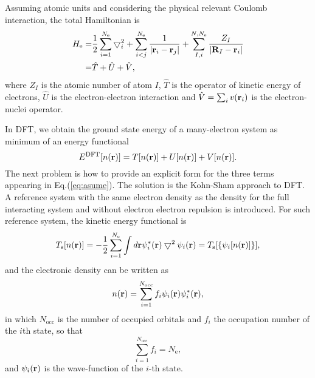 Assuming atomic units and considering the physical relevant Coulomb interaction, the total Hamiltonian is 
\begin{align}        
        H_{\text{e}} =& \frac{1}{2}\sum_{i=1}^{N_{\text{e}}}\bigtriangledown_i^2 +\sum_{i<j}^{N_{\text{e}}}\frac{1}{|{\bf r}_i -{\bf r}_j|} +\sum_{I,i}^{N,N_{\text{e}}}\frac{Z_I}{|{\bf R}_I - {\bf r}_i|}   \nonumber \\
        =& {\hat{T}}+{\hat{U}}+{\hat{V}},
\label{eq:H}
\end{align}
where $Z_I$ is the atomic number of atom $I$, ${\hat{T}}$ is the operator of kinetic energy of electrons, ${\hat{U}}$ is the 
electron-electron interaction and  ${\hat{V}}=\sum_i v({\bf r}_i)$ is the electron-nuclei operator.

In DFT, we obtain the ground state energy of a many-electron system as minimum of an energy functional
\begin{equation}
E^{\text{DFT}}[n({\bf r})] = T[{n (\bf r)}] + U[n({\bf r})] + V[n(\bf r)].
\label{eq:asume}
\end{equation}
The next problem is how to provide an explicit form for the three terms appearing in Eq.\thinspace(\ref{eq:asume}). 
The solution is the Kohn-Sham approach to DFT. 
A reference system with the same electron density as the density for the full interacting system  and without electron electron repulsion is introduced. 
For such reference system, the kinetic energy functional is
\begin{equation}
        T_\text{s}[n({\bf r})]= - \frac{1}{2}\sum_{i=1}^{N_{\text{e}}}\int d{\bf r} \psi_i^*({\bf r})\bigtriangledown^2\psi_i({\bf r})
        = T_\text{s}[\{\psi_i[n({\bf r})]\}],
 \label{eq:kinetic_ks}
\end{equation}
and the electronic density can be written as 
\begin{equation}
n({\bf r})=\sum_{i=1}^{N_{\text{occ}}}f_i \psi_i({\bf r})\psi_i^*({\bf r}),
\end{equation}
in which $N_{\text{occ}}$ is the number of occupied orbitals and $f_i$ the occupation number of the $i$th state, so that
\begin{equation}
 \sum_{i=1}^{N_{\text{occ}}}f_i =N_{\text{e}},
\end{equation}
and $\psi_i({\bf r})$ is the wave-function of the $i$-th state. 


